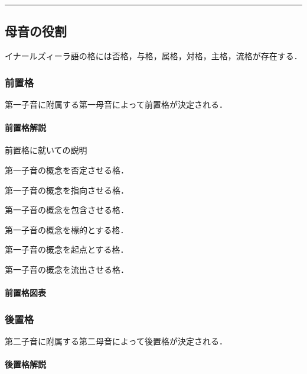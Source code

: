 \documentclass[
  japanese,
]{article}
\providecommand{\tightlist}{%
  \setlength{\itemsep}{0pt}\setlength{\parskip}{0pt}}
\begin{document}
\begin{center}\rule{0.5\linewidth}{0.5pt}\end{center}

\subsection{母音の役割}\label{chapter5}

イナールズィーラ語の格には否格，与格，属格，対格，主格，流格が存在する．

\subsubsection{前置格}\label{section5.1}

第一子音に附属する第一母音によって前置格が決定される．

\paragraph{前置格解説}\label{subsection5.1.1}

前置格に就いての説明

\begin{description}
\tightlist
\item[否格]
第一子音の概念を否定させる格．
\item[与格]
第一子音の概念を指向させる格．
\item[属格]
第一子音の概念を包含させる格．
\item[対格]
第一子音の概念を標的とする格．
\item[主格]
第一子音の概念を起点とする格．
\item[流格]
第一子音の概念を流出させる格．
\end{description}

\paragraph{前置格図表}\label{subsection5.1.2}

\subsubsection{後置格}\label{section5.2}

第二子音に附属する第二母音によって後置格が決定される．

\paragraph{後置格解説}\label{subsection5.2.1}
\end{document}
